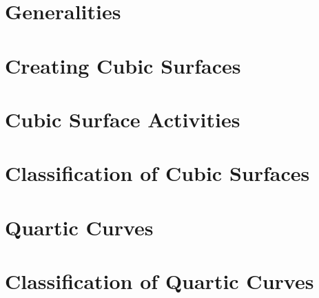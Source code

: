 
\section{Generalities}
\label{sec:cubicsurfaces:generalties}




\bigskip

\clearpage



\section{Creating Cubic Surfaces}
\label{sec:cubicsurfaces:creation}




\bigskip

\clearpage


\section{Cubic Surface Activities}
\label{sec:cubicsurfaces:activities}




\bigskip

\clearpage





\section{Classification of Cubic Surfaces}
\label{sec:cubicsurfaces:classification}




\bigskip

\clearpage




\section{Quartic Curves}
\label{sec:cubic:surfaces:quartic:curves}




\bigskip

\clearpage


\section{Classification of Quartic Curves}
\label{sec:quartic:curves:classification}

